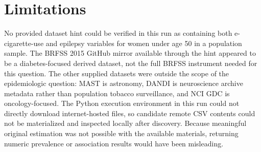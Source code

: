 \documentclass[11pt]{article}
\begin{document}
\section{Limitations}
No provided dataset hint could be verified in this run as containing both e-cigarette-use and epilepsy variables for women under age 50 in a population sample. The BRFSS 2015 GitHub mirror available through the hint appeared to be a diabetes-focused derived dataset, not the full BRFSS instrument needed for this question. The other supplied datasets were outside the scope of the epidemiologic question: MAST is astronomy, DANDI is neuroscience archive metadata rather than population tobacco surveillance, and NCI GDC is oncology-focused. The Python execution environment in this run could not directly download internet-hosted files, so candidate remote CSV contents could not be materialized and inspected locally after discovery. Because meaningful original estimation was not possible with the available materials, returning numeric prevalence or association results would have been misleading.



\end{document}
